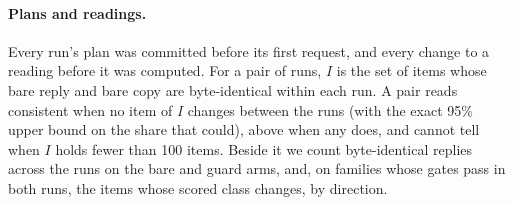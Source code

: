 \paragraph{Plans and readings.} Every run's plan was committed before its first request, and every change to a reading before it was
computed. For a pair of runs, $I$ is the set of items whose bare reply and bare copy are byte-identical within each run. A pair reads
consistent when no item of $I$ changes between the runs (with the exact 95\% upper bound on the share that could), above when any does,
and cannot tell when $I$ holds fewer than 100 items. Beside it we count byte-identical replies across the runs on the bare and guard arms,
and, on families whose gates pass in both runs, the items whose scored class changes, by direction.
